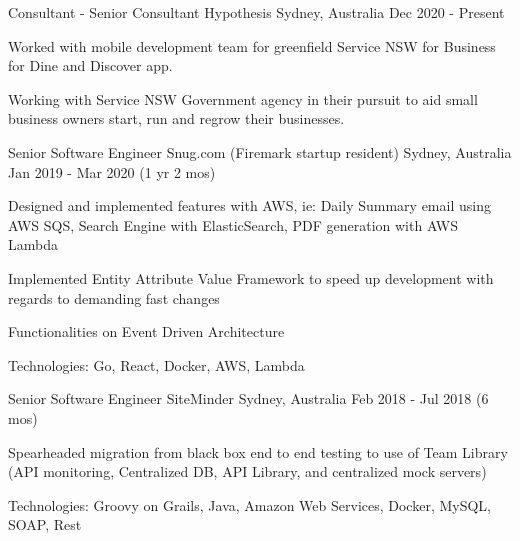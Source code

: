 

\begin{cventries}

  \cventry
  {Consultant - Senior Consultant} %
  {Hypothesis} %
  {Sydney, Australia} %
  {Dec 2020 - Present} %
  {
    \begin{cvitems} %
      \item {Worked with mobile development team for greenfield Service NSW for Business for Dine and Discover app.}
      \item {Working with Service NSW Government agency in their pursuit to aid small business owners start, run and regrow their businesses.}
    \end{cvitems}
  }

  \cventry
  {Senior Software Engineer} %
  {Snug.com (Firemark startup resident)} %
  {Sydney, Australia} %
  {Jan 2019 - Mar 2020 (1 yr 2 mos)} %
  {
    \begin{cvitems} %
      \item{Designed and implemented features with AWS, ie: Daily Summary email using AWS SQS, Search Engine with ElasticSearch, PDF generation with AWS Lambda}
      \item{Implemented Entity Attribute Value Framework to speed up development with regards to demanding fast changes}
      \item{Functionalities on Event Driven Architecture}
      \item{Technologies: Go, React, Docker, AWS, Lambda}
    \end{cvitems}
  }

  \cventry
  {Senior Software Engineer} %
  {SiteMinder} %
  {Sydney, Australia} %
  {Feb 2018 - Jul 2018 (6 mos)} %
  {
    \begin{cvitems} %
      \item {Spearheaded migration from black box end to end testing to use of Team Library (API monitoring, Centralized DB, API Library, and centralized mock servers)}
      \item {Technologies: Groovy on Grails, Java, Amazon Web Services, Docker, MySQL, SOAP, Rest}
    \end{cvitems}
  }


\end{cventries}
